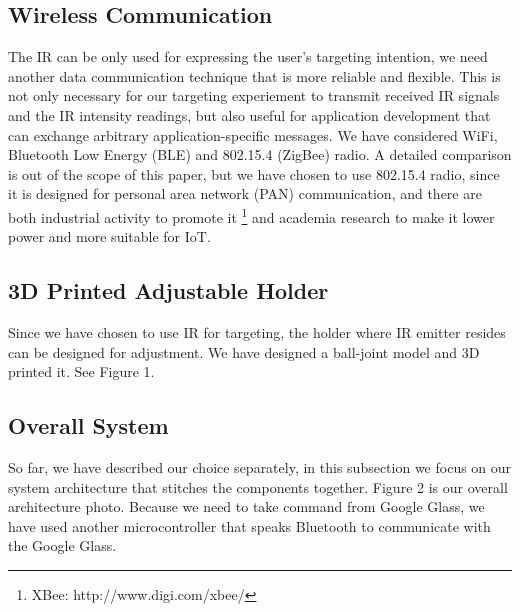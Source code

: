 \subsection{Wireless Communication}
\label{sec:wirel-comm}
The IR can be only used for expressing the user's targeting intention, we need another data communication technique that is more reliable and flexible. This is not only necessary for our targeting experiement to transmit received IR signals and the IR intensity readings, but also useful for application development that can exchange arbitrary application-specific messages. We have considered WiFi, Bluetooth Low Energy (BLE) and 802.15.4 (ZigBee) radio. A detailed comparison is out of the scope of this paper, but we have chosen to use 802.15.4 radio, since it is designed for personal area network (PAN) communication, and there are both industrial activity to promote it \footnote{XBee: http://www.digi.com/xbee/} and academia research \cite{watteyne2012openwsn} to make it lower power and more suitable for IoT.

\subsection{3D Printed Adjustable Holder}
\label{sec:3d-print-adjust}
Since we have chosen to use IR for targeting, the holder where IR emitter resides can be designed for adjustment. We have designed a ball-joint model and 3D printed it. See Figure 1.

\subsection{Overall System}
\label{sec:overall-system}
So far, we have described our choice separately, in this subsection we focus on our system architecture that stitches the components together. 
Figure 2 is our overall architecture photo. Because we need to take command from Google Glass, we have used another microcontroller that speaks Bluetooth to communicate with the Google Glass. 



